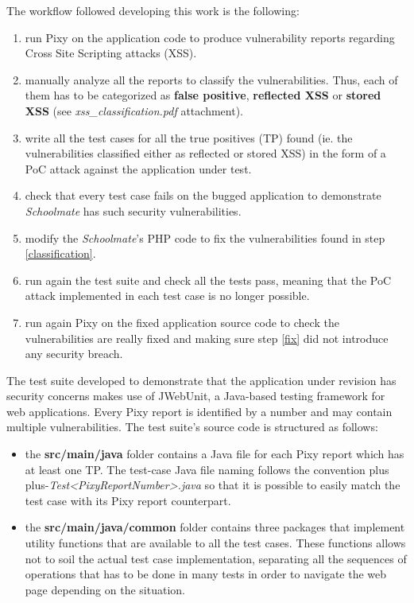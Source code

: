 \documentclass{sig-alternate-05-2015}
\newcommand\lword[1]{\leavevmode\nobreak\hskip0pt plus\linewidth\penalty50\hskip0pt plus-\linewidth\nobreak#1}
\begin{document}
The workflow followed developing this work is the following:
\begin{enumerate}
    \item run Pixy on the application code to produce vulnerability reports
        regarding Cross Site Scripting attacks (XSS).
    \item \label{classification} manually analyze all the reports to classify the vulnerabilities.
        Thus, each of them has to be categorized as \textbf{false positive},
        \textbf{reflected XSS} or \textbf{stored XSS} (see \emph{xss\_classification.pdf}
        attachment).
    \item write all the test cases for all the true positives (TP) found (ie. the
        vulnerabilities classified either as reflected or stored XSS) in the form
        of a PoC attack against the application under test.
    \item check that every test case fails on the bugged application to demonstrate
        \emph{Schoolmate} has such security vulnerabilities.
    \item \label{fix} modify the \emph{Schoolmate}'s PHP code to fix the vulnerabilities found
        in step \ref{classification}.
    \item run again the test suite and check all the tests pass, meaning that
        the PoC attack implemented in each test case is no longer possible.
    \item run again Pixy on the fixed application source code to check the
        vulnerabilities are really fixed and making sure step \ref{fix} did not
        introduce any security breach.
\end{enumerate}
The test suite developed to demonstrate that the application under revision has
security concerns makes use of JWebUnit, a Java-based testing framework for web
applications. Every Pixy report is identified by a number and may contain multiple
vulnerabilities. The test suite's source code is structured as follows:
\begin{itemize}
    \item the \textbf{src/main/java} folder contains a Java file for each Pixy report which
        has at least one TP. The test-case Java file naming follows the convention
        \lword{\emph{Test<PixyReportNumber>.java}} so that it is possible to easily match the test
        case with its Pixy report counterpart.
    \item the \textbf{src/main/java/common} folder contains three packages that implement
        utility functions that are available to all the test cases. These functions
        allows not to soil the actual test case implementation, separating all the
        sequences of operations that has to be done in many tests in order to navigate
        the web page depending on the situation.
\end{itemize}
\end{document}
